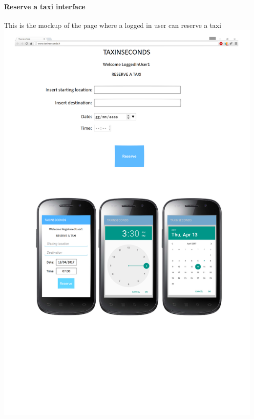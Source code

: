 \documentclass{article}
\begin{document}
\paragraph{Reserve a taxi interface}
This is the mockup of the page where a logged in user can reserve a taxi
\includegraphics{Reserve a taxi}
\clearpage
\end{document}
